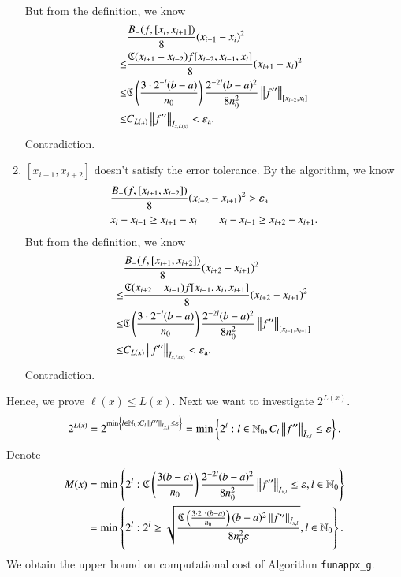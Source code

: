 \begin{enumerate}
  But from the definition, we know
  \begin{align*}
  & \frac{B_-(f,[x_{i},x_{i+1}])}{8}(x_{i+1}-x_{i})^2 \\ \le &\frac{\fC(x_{i+1}-x_{i-2})f[x_{i-2},x_{i-1},x_{i}]}{8}(x_{i+1}-x_{i})^2\\
    \le & \fC\left(\frac{3\cdot2^{-l}(b-a)}{n_0}\right) \frac{2^{-2l}(b-a)^2}{8n^2_0}\norm[{[x_{i-2},x_{i}]}]{f''} \\
     \le & C_{L(x)} \norm[\bar{I}_{x,L(x)}]{f''}< \abstol.
  \end{align*}
  Contradiction.
  \item $[x_{i+1},x_{i+2}]$ doesn't satisfy the error tolerance. By the algorithm, we know
  \begin{align*} &\frac{B_-(f,[x_{i+1},x_{i+2}])}{8}(x_{i+2}-x_{i+1})^2 > \abstol \\
  & x_i-x_{i-1} \ge x_{i+1}-x_{i} \qquad x_i-x_{i-1} \ge x_{i+2}-x_{i+1}.
  \end{align*}
  But from the definition, we know
  \begin{align*}
  & \frac{B_-(f,[x_{i+1},x_{i+2}])}{8}(x_{i+2}-x_{i+1})^2 \\ \le &\frac{\fC(x_{i+2}-x_{i-1})f[x_{i-1},x_{i},x_{i+1}]}{8}(x_{i+2}-x_{i+1})^2\\
    \le & \fC\left(\frac{3\cdot2^{-l}(b-a)}{n_0}\right) \frac{2^{-2l}(b-a)^2}{8n^2_0}\norm[{[x_{i-1},x_{i+1}]}]{f''} \\
     \le & C_{L(x)} \norm[\bar{I}_{x,L(x)}]{f''}<\abstol.
  \end{align*}
  Contradiction.
\end{enumerate}

Hence, we prove $\ell(x) \le L(x)$. Next we want to investigate $2^{L(x)}$.
$$
2^{L(x)}=2^{\min \left\{ l \in \natzero : C_l  \norm[\bar{I}_{x,l}]{f''} \le \varepsilon\right\}} = \min\left\{2^l: l \in  \natzero, C_l \norm[\bar{I}_{x,l}]{f''} \le \varepsilon\right\}.$$
Denote
\begin{align}\label{mxdef}
M(x) & = \min\left\{2^l:  \fC\left(\frac{3(b-a)}{n_0}\right) \frac{2^{-2l}(b-a)^2}{8n^2_0} \norm[\bar{I}_{x,l}]{f''}  \le \varepsilon,  l \in  \natzero\right\}\nonumber \\
 & = \min\left\{2^l:  2^l \ge \sqrt{\frac{\fC\left(\frac{3 \cdot 2^{-l}(b-a)}{n_0}\right)  (b-a)^2  \norm[\bar{I}_{x,l}]{f''} }{8n^2_0\varepsilon}},  l \in  \natzero\right\}.
\end{align}
We obtain the upper bound on computational cost of Algorithm \texttt{funappx\_g}.

